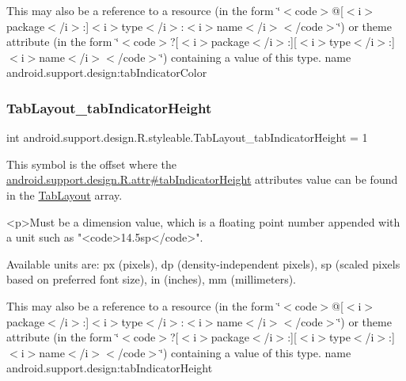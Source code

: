 This may also be a reference to a resource (in the form \char`\"{}$<$code$>$@\mbox{[}$<$i$>$package$<$/i$>$\+:\mbox{]}$<$i$>$type$<$/i$>$\+:$<$i$>$name$<$/i$>$$<$/code$>$\char`\"{}) or theme attribute (in the form \char`\"{}$<$code$>$?\mbox{[}$<$i$>$package$<$/i$>$\+:\mbox{]}\mbox{[}$<$i$>$type$<$/i$>$\+:\mbox{]}$<$i$>$name$<$/i$>$$<$/code$>$\char`\"{}) containing a value of this type.  name android.\+support.\+design\+:tab\+Indicator\+Color \mbox{\label{classandroid_1_1support_1_1design_1_1R_1_1styleable_a29ccf4ce74e5f86bb3d08031376f07ce}} 
\subsubsection{\texorpdfstring{Tab\+Layout\+\_\+tab\+Indicator\+Height}{TabLayout\_tabIndicatorHeight}}
{\footnotesize\ttfamily int android.\+support.\+design.\+R.\+styleable.\+Tab\+Layout\+\_\+tab\+Indicator\+Height = 1\hspace{0.3cm}{\ttfamily [static]}}

This symbol is the offset where the \hyperlink{classandroid_1_1support_1_1design_1_1R_1_1attr_a690f28988df1557974bcfc4bd4e877a9}{android.\+support.\+design.\+R.\+attr\#tab\+Indicator\+Height} attribute\textquotesingle{}s value can be found in the \hyperlink{classandroid_1_1support_1_1design_1_1R_1_1styleable_a514b47b47f600f9421b65f4f0aa832d6}{Tab\+Layout} array.

\begin{DoxyVerb}      <p>Must be a dimension value, which is a floating point number appended with a unit such as "<code>14.5sp</code>".
\end{DoxyVerb}
 Available units are\+: px (pixels), dp (density-\/independent pixels), sp (scaled pixels based on preferred font size), in (inches), mm (millimeters). 

This may also be a reference to a resource (in the form \char`\"{}$<$code$>$@\mbox{[}$<$i$>$package$<$/i$>$\+:\mbox{]}$<$i$>$type$<$/i$>$\+:$<$i$>$name$<$/i$>$$<$/code$>$\char`\"{}) or theme attribute (in the form \char`\"{}$<$code$>$?\mbox{[}$<$i$>$package$<$/i$>$\+:\mbox{]}\mbox{[}$<$i$>$type$<$/i$>$\+:\mbox{]}$<$i$>$name$<$/i$>$$<$/code$>$\char`\"{}) containing a value of this type.  name android.\+support.\+design\+:tab\+Indicator\+Height \mbox{\label{classandroid_1_1support_1_1design_1_1R_1_1styleable_af4f364340f303b8dbcdc26f58bd5fb41}} 
